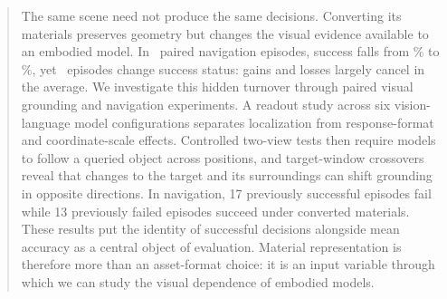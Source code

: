 \begin{abstract}
The same scene need not produce the same decisions. Converting its materials
preserves geometry but changes the visual evidence available to an embodied
model. In \NavN\ paired navigation episodes, success falls from
\NavSrOriginal\% to \NavSrConverted\%, yet \NavFlips\ episodes change success
status: gains and losses largely cancel in the average. We investigate this
hidden turnover through paired visual grounding and navigation experiments.
A readout study across six vision-language model configurations separates
localization from response-format and coordinate-scale effects. Controlled
two-view tests then require models to follow a queried object across positions,
and target-window crossovers reveal that changes to the target and its
surroundings can shift grounding in opposite directions. In navigation,
17 previously successful episodes fail while 13 previously failed episodes
succeed under converted materials. These results put the identity of successful
decisions alongside mean accuracy as a central object of evaluation. Material
representation is therefore more than an asset-format choice: it is an input
variable through which we can study the visual dependence of embodied models.
\end{abstract}
